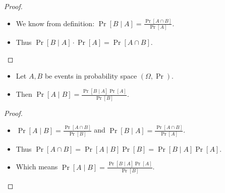\documentclass{beamer}
\begin{document}
\begin{frame}
  \begin{proof}
    \begin{itemize}
      \item We know from definition: \(\Pr[B\mid A] = \frac{\Pr[A\cap 
            B]}{\Pr[A]}\).

      \item Thus \(\Pr[B\mid A]\cdot \Pr[A] = \Pr[A\cap B]\).
    \end{itemize}
  \end{proof}
\end{frame}

\begin{frame}
  \begin{theorem}
    \begin{itemize}
      \item Let \(A, B\) be events in probability space \((\Omega, \Pr)\).
      \item Then \(
          \Pr[A\mid B] = \frac{\Pr[B\mid A]\Pr[A]}{\Pr[B]}.
        \)
    \end{itemize}
  \end{theorem}

  \pause{}

  \begin{proof}
    \begin{itemize}
      \item \(\Pr[A\mid B] = \frac{\Pr[A\cap B]}{\Pr[B]}\) and \(\Pr[B\mid A] 
          = \frac{\Pr[A\cap B]}{\Pr[A]}\).

        \pause{}

      \item Thus \(\Pr[A\cap B] = \Pr[A\mid B] \Pr[B] = \Pr[B\mid A] \Pr[A]\).

        \pause{}

      \item Which means \(\Pr[A\mid B] = \frac{\Pr[B\mid A] \Pr[A]}{\Pr[B]}\).
    \end{itemize}
  \end{proof}
\end{frame}
\end{document}

